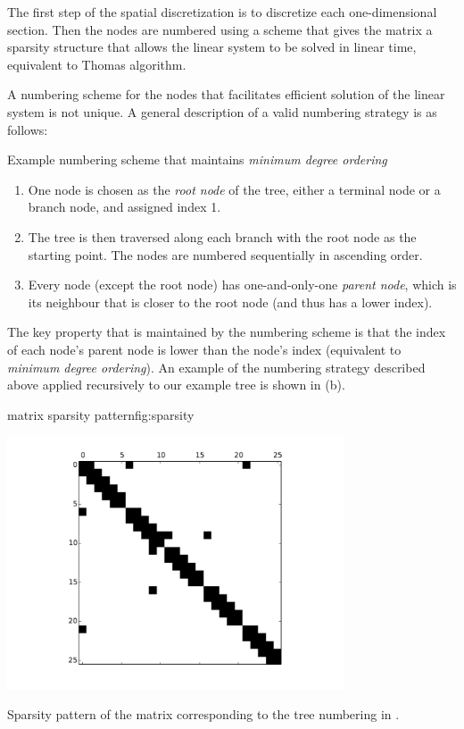 The first step of the spatial discretization is to discretize each one-dimensional section. Then the nodes are numbered using a scheme that gives the matrix a sparsity structure that allows the linear system to be solved in linear time, equivalent to Thomas algorithm.

A numbering scheme for the nodes that facilitates efficient solution of the linear system is not unique. A general description of a valid numbering strategy is as follows:
\begin{infobox}{Example numbering scheme that maintains \textit{minimum degree ordering}}
\begin{enumerate}[leftmargin=*]
    \item
        One node is chosen as the \emph{root node} of the tree, either a terminal node or a branch node, and assigned index 1.
    \item
        The tree is then traversed along each branch with the root node as the starting point. The nodes are numbered sequentially in ascending order.
    \item
        Every node (except the root node) has one-and-only-one \emph{parent node}, which is its neighbour that is closer to the root node (and thus has a lower index).
\end{enumerate}
\end{infobox}
The key property that is maintained by the numbering scheme is that the index of each node's parent node is lower than the node's index (equivalent to \emph{minimum degree ordering}). An example of the numbering strategy described above applied recursively to our example tree is shown in (b).

\begin{myfigure}{matrix sparsity pattern}{fig:sparsity}
\begin{center}
\includegraphics[width=0.75\textwidth]{./images/sparsity.pdf}
\end{center}
Sparsity pattern of the matrix corresponding to the tree numbering in .
\end{myfigure}

